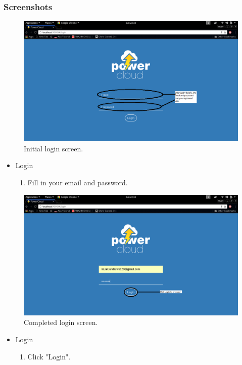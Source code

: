 \documentclass[a4paper,10pt]{article}
\begin{document}
		\subsubsection{Screenshots}	
		\begin{figure}[H]
			\includegraphics[width=\textwidth]{images/login.png}
			\caption{Initial login screen. \label{overflow}}
		\end{figure}
		\begin{itemize}
			\item Login
			\begin{enumerate}
				\item Fill in your email and password.
			\end{enumerate}
		\end{itemize}
		
		\begin{figure}[H]
			\includegraphics[width=\textwidth]{images/login2.png}
			\caption{Completed login screen. \label{overflow}}
		\end{figure}
		\begin{itemize}
			\item Login
			\begin{enumerate}
				\item Click "Login".
			\end{enumerate}
		\end{itemize}
		
\end{document}
